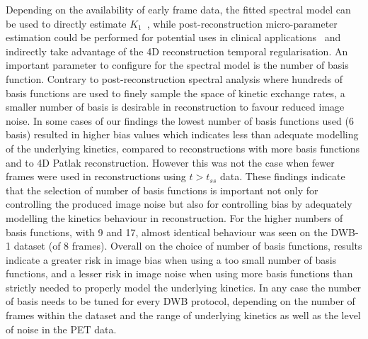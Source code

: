 Depending on the availability of early frame data, the fitted spectral model can be used to directly estimate $K_1$~\cite{Meikle1998,Matthews2010}, 
while post-reconstruction micro-parameter estimation could be performed for potential uses in clinical applications~\cite{Novosad2016b,Zaker2020} and indirectly take advantage of the 4D reconstruction temporal regularisation.
An important parameter to configure for the spectral model is the number of basis function. 
Contrary to post-reconstruction spectral analysis where hundreds of basis functions are used to finely sample the space of kinetic exchange rates, a smaller number of basis is desirable in reconstruction to favour reduced image noise.
In some cases of our findings the lowest number of basis functions used (6 basis) resulted in higher bias values which indicates less than adequate modelling of the underlying kinetics, compared to reconstructions with more basis functions and to 4D Patlak reconstruction. However this was not the case when fewer frames were used in reconstructions using $t>t_{ss}$ data. 
These findings indicate that the selection of number of basis functions is important not only for controlling the produced image noise but also for controlling bias by adequately modelling the kinetics behaviour in reconstruction. 
For the higher numbers of basis functions, with 9 and 17, almost identical behaviour was seen on the DWB-1 dataset (of 8 frames). 
Overall on the choice of number of basis functions, results indicate a greater risk in image bias when using a too small number of basis functions, and a lesser risk in image noise when using more basis functions than strictly needed to properly model the underlying kinetics.
In any case the number of basis needs to be tuned for every DWB protocol, depending on the number of frames within the dataset and the range of underlying kinetics as well as the level of noise in the PET data.

